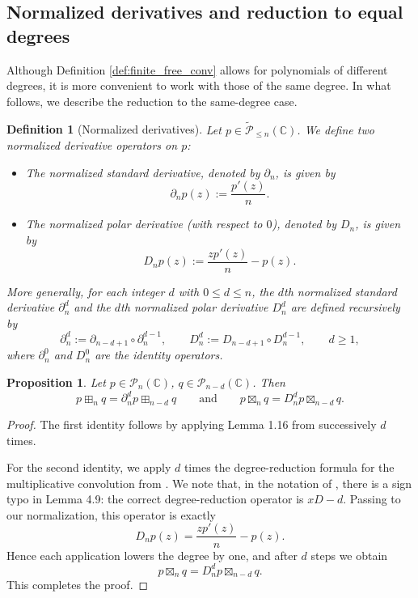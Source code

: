 \documentclass[a4paper,11pt]{amsart}
\numberwithin{equation}{section}
\newtheorem{proposition}[theorem]{Proposition}
\newtheorem{definition}[theorem]{Definition}
\newcommand{\C}{\mathbb{C}}
\newcommand{\pols}{\mathcal P}
\begin{document}
\subsection{Normalized derivatives and reduction to equal degrees}
Although Definition \ref{def:finite_free_conv} allows for polynomials of different degrees, it is more convenient to work with those of the same degree. In what follows, we describe the reduction to the same-degree case.
\begin{definition}[Normalized derivatives]
Let $p \in \tilde{\pols}_{\le n}(\C)$. We define two normalized derivative operators on $p$:

\begin{itemize}
    \item[(i)] The normalized standard derivative, denoted by $\partial_n$, is given by
    \[
        \partial_n p(z) := \frac{p'(z)}{n}.
    \]

    \item[(ii)] The normalized polar derivative (with respect to $0$), denoted by $D_n$, is given by
    \[
        D_n p(z) := \frac{z p'(z)}{n} - p(z).
    \]
\end{itemize}

More generally, for each integer $d$ with $0 \le d \le n$, the $d$th normalized standard derivative $\partial_n^d$ and the $d$th normalized polar derivative $D_n^d$ are defined recursively by
\[
    \partial_n^d := \partial_{n-d+1} \circ \partial_n^{d-1},
    \qquad
    D_n^d := D_{n-d+1} \circ D_n^{d-1},\qquad d\geq 1,
\]
    where $\partial_n^0$ and $D_n^0$ are the identity operators. 
\end{definition}



\begin{proposition}\label{prop:conv_diff_deg}
    Let $p\in\pols_n(\C)$, $q\in\pols_{n-d}(\C)$. Then
    \[
    p\boxplus_n q =\partial_n^dp\boxplus_{n-d}q \qquad\mbox{and}\qquad p\boxtimes_nq=D_n^dp \boxtimes_{n-d}q.
    \]
\end{proposition}
\begin{proof}
    The first identity follows by applying Lemma 1.16 from \cite{MSS} successively $d$ times.

    For the second identity, we apply $d$ times the degree-reduction formula for the multiplicative convolution from \cite[Lemma 4.9]{MSS}. We note that, in the notation of \cite{MSS}, there is a sign typo in Lemma 4.9: the correct degree-reduction operator is $xD-d$. Passing to our normalization, this operator is exactly
    \[
    D_n p(z)=\frac{zp'(z)}{n}-p(z).
    \]
    Hence each application lowers the degree by one, and after $d$ steps we obtain
    \[
    p\boxtimes_n q = D_n^d p \boxtimes_{n-d} q.
    \]
    This completes the proof.
\end{proof}
\end{document}
